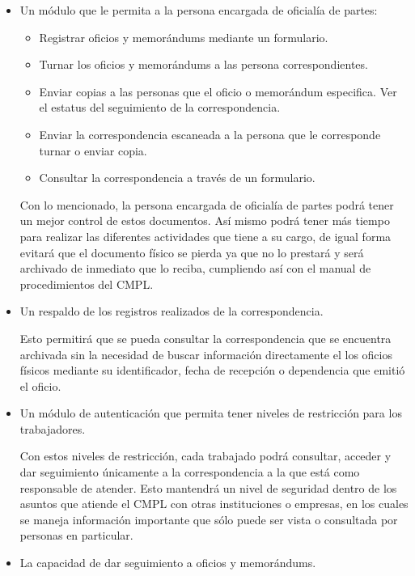 	\begin{itemize}
	
	\item Un módulo que le permita a la persona encargada de oficialía de partes:
		\begin{itemize}
			\item Registrar oficios y memorándums mediante un formulario.
			\item Turnar los oficios y memorándums a las persona correspondientes.
			\item Enviar copias a las personas que el oficio o memorándum especifica.
			\iten Ver el estatus del seguimiento de la correspondencia.
			\item Enviar la correspondencia escaneada a la persona que le corresponde turnar o enviar copia.
			\item Consultar la correspondencia a través de un formulario.
			
		\end{itemize}
	Con lo mencionado, la persona encargada de oficialía de partes podrá tener un mejor control de estos documentos. Así mismo podrá tener más tiempo para realizar las diferentes actividades que tiene a su cargo, de igual forma evitará que el documento físico se pierda ya que no lo prestará y será archivado de inmediato que lo reciba, cumpliendo así con el manual de procedimientos del CMPL.
	
	\item Un respaldo de los registros realizados de la correspondencia.
	
Esto permitirá que se pueda consultar la correspondencia que se encuentra archivada sin la necesidad de buscar información directamente el los oficios físicos mediante su identificador, fecha de recepción o dependencia que emitió el oficio.

	\item Un módulo de autenticación que permita tener niveles de restricción para los trabajadores.
	
Con estos niveles de restricción, cada trabajado podrá consultar, acceder y dar seguimiento únicamente a la correspondencia a la que está como responsable de atender. Esto mantendrá un nivel de seguridad dentro de los asuntos que atiende el CMPL con otras instituciones o empresas, en los cuales se maneja información importante que sólo puede ser vista o consultada por personas en particular.
	
	\item La capacidad de dar seguimiento a oficios y memorándums.	
	

\end{itemize}
